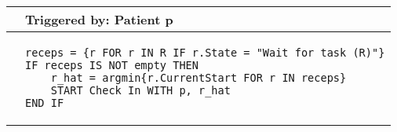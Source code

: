 \begin{tabular}{@{}>{\raggedright\arraybackslash}p{0.25cm}>{\raggedright\arraybackslash}p{13cm}@{}}
  \toprule
   & Triggered by: Patient p\\ \midrule 
  &
\vspace{-12pt}
\begin{lstlisting}[language=CMPseudo]
receps = {r FOR r IN R IF r.State = "Wait for task (R)"}
IF receps IS NOT empty THEN 
    r_hat = argmin{r.CurrentStart FOR r IN receps}
    START Check In WITH p, r_hat
END IF
\end{lstlisting}
  \\ \bottomrule
  \end{tabular}
